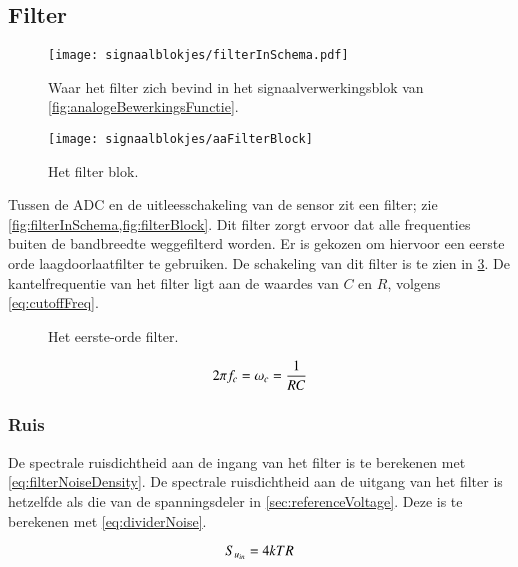 \subsection{Filter}
\begin{figure}[!htbp]
    \centering
    \texttt{[image: signaalblokjes/filterInSchema.pdf]}
    \caption{Waar het filter zich bevind in het signaalverwerkingsblok van \cref{fig:analogeBewerkingsFunctie}.}
    \label{fig:filterInSchema}
\end{figure}
\begin{figure}[!htbp]
    \centering
    \texttt{[image: signaalblokjes/aaFilterBlock]}
    \caption{Het filter blok.}
    \label{fig:filterBlock}
\end{figure}
Tussen de ADC en de uitleesschakeling van de sensor zit een filter; zie \cref{fig:filterInSchema,fig:filterBlock}. Dit filter zorgt ervoor dat alle frequenties buiten de bandbreedte weggefilterd worden. Er is gekozen om hiervoor een eerste orde laagdoorlaatfilter te gebruiken.
De schakeling van dit filter is te zien in \cref{fig:filterCircuit}. De kantelfrequentie van het filter ligt aan de waardes van $C$ en $R$, volgens \cref{eq:cutoffFreq}.
\begin{figure}[!htbp]
    \centering
    \def\svgwidth{0.3\textwidth}
    
    \caption{Het eerste-orde filter.}
    \label{fig:filterCircuit}
\end{figure}
\begin{equation} \label{eq:cutoffFreq}
    2\pi f_c = \omega_c = \frac{1}{RC}
    \tagaddtext{[\si{\radian\per\second}]}
\end{equation}

\subsubsection{Ruis}
De spectrale ruisdichtheid aan de ingang van het filter is te berekenen met \cref{eq:filterNoiseDensity}.
De spectrale ruisdichtheid aan de uitgang van het filter is hetzelfde als die van de spanningsdeler in \cref{sec:referenceVoltage}. Deze is te berekenen met \cref{eq:dividerNoise}.




\begin{equation} \label{eq:filterNoiseDensity}
    S_{u_{in}} = 4kTR
    \tagaddtext{[\si{\volt\squared\per\hertz}]}
\end{equation}

